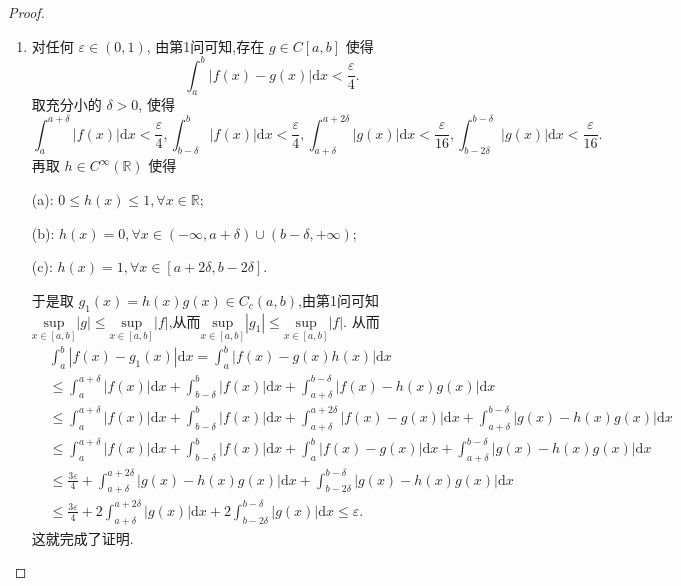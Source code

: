 \documentclass[../../main.tex]{subfiles}%
\begin{document}
\begin{proof}
\begin{enumerate}[(1)]
\item 对任何 $\varepsilon \in (0,1)$, 由第1问可知,存在 $g \in C[a,b]$ 使得
\[
\int_{a}^{b} |f(x) - g(x)|\mathrm{d}x < \frac{\varepsilon}{4}.
\]
取充分小的 $\delta > 0$, 使得
\[
\int_{a}^{a + \delta} |f(x)|\mathrm{d}x < \frac{\varepsilon}{4}, \int_{b - \delta}^{b} |f(x)|\mathrm{d}x < \frac{\varepsilon}{4}, \int_{a + \delta}^{a + 2\delta} |g(x)|\mathrm{d}x < \frac{\varepsilon}{16}, \int_{b - 2\delta}^{b - \delta} |g(x)|\mathrm{d}x < \frac{\varepsilon}{16}.
\]
再取 $h \in C^{\infty}(\mathbb{R})$ 使得

(a): $0 \leqslant h(x) \leqslant 1, \forall x \in \mathbb{R}$;

(b): $h(x) = 0, \forall x \in (-\infty,a + \delta) \cup (b - \delta,+\infty)$;

(c): $h(x) = 1, \forall x \in [a + 2\delta,b - 2\delta]$.

于是取 $g_1(x) = h(x)g(x) \in C_c(a,b)$,由第1问可知$\underset{x\in \left[ a,b \right]}{\mathrm{sup}}\left| g \right|\leqslant \underset{x\in \left[ a,b \right]}{\mathrm{sup}}\left| f \right|$,从而$\underset{x\in \left[ a,b \right]}{\mathrm{sup}}\left| g_1 \right|\leqslant \underset{x\in \left[ a,b \right]}{\mathrm{sup}}\left| f \right|$.
从而
\begin{align*}
&\int_{a}^{b} |f(x) - g_1(x)|\mathrm{d}x = \int_{a}^{b} |f(x) - g(x)h(x)|\mathrm{d}x \\
&\leqslant \int_{a}^{a + \delta} |f(x)|\mathrm{d}x + \int_{b - \delta}^{b} |f(x)|\mathrm{d}x + \int_{a + \delta}^{b - \delta} |f(x) - h(x)g(x)|\mathrm{d}x \\
&\leqslant \int_{a}^{a + \delta} |f(x)|\mathrm{d}x + \int_{b - \delta}^{b} |f(x)|\mathrm{d}x + \int_{a + \delta}^{a + 2\delta} |f(x) - g(x)|\mathrm{d}x + \int_{a + \delta}^{b - \delta} |g(x) - h(x)g(x)|\mathrm{d}x \\
&\leqslant \int_{a}^{a + \delta} |f(x)|\mathrm{d}x + \int_{b - \delta}^{b} |f(x)|\mathrm{d}x + \int_{a}^{b} |f(x) - g(x)|\mathrm{d}x + \int_{a + \delta}^{b - \delta} |g(x) - h(x)g(x)|\mathrm{d}x \\
&\leqslant \frac{3\varepsilon}{4} + \int_{a + \delta}^{a + 2\delta} |g(x) - h(x)g(x)|\mathrm{d}x + \int_{b - 2\delta}^{b - \delta} |g(x) - h(x)g(x)|\mathrm{d}x \\
&\leqslant \frac{3\varepsilon}{4} + 2 \int_{a + \delta}^{a + 2\delta} |g(x)|\mathrm{d}x + 2 \int_{b - 2\delta}^{b - \delta} |g(x)|\mathrm{d}x \leqslant \varepsilon.
\end{align*}
这就完成了证明.


\end{enumerate}
\end{proof}
\end{document}

